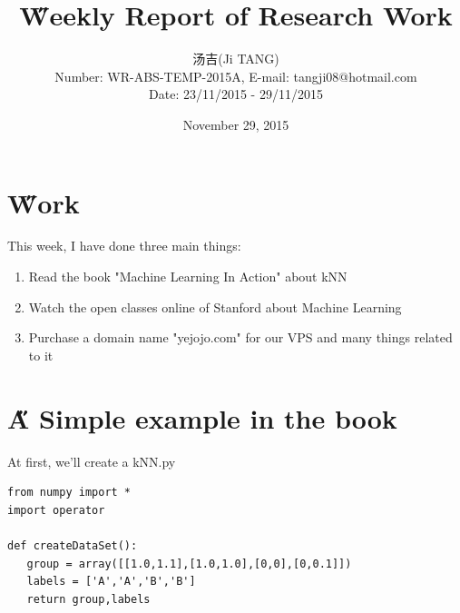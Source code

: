\documentclass[12pt]{article}
\title{{\H Weekly Report of Research Work\\ }\quad {WR-ABS-TEMP-2015A-No.002}}
\author{汤吉(Ji TANG)\\
               Number: WR-ABS-TEMP-2015A,  E-mail: tangji08@hotmail.com \\
        Date: 23/11/2015 - 29/11/2015}
\date{November 29, 2015}
\begin{document}
  
\maketitle
\pagestyle{fancy}
\fancyhead[LO,RE]{\leftmark} %



\renewcommand{\headrulewidth}{0.4pt}
\renewcommand{\footrulewidth}{0.4pt}



\tableofcontents 
\newpage
\section{\H Work}
This week, I have done three main things:
\begin{enumerate}
	\item Read the book "Machine Learning In Action" about kNN
	\item Watch the open classes online of Stanford about Machine Learning
	\item Purchase a domain name "yejojo.com" for our VPS and many things related to it
\end{enumerate}

\section{\H A Simple example in the book}
At first, we'll create a kNN.py
\begin{lstlisting}
from numpy import *
import operator

def createDataSet():
   group = array([[1.0,1.1],[1.0,1.0],[0,0],[0,0.1]])
   labels = ['A','A','B','B']
   return group,labels
\end{lstlisting}
\end{document}
